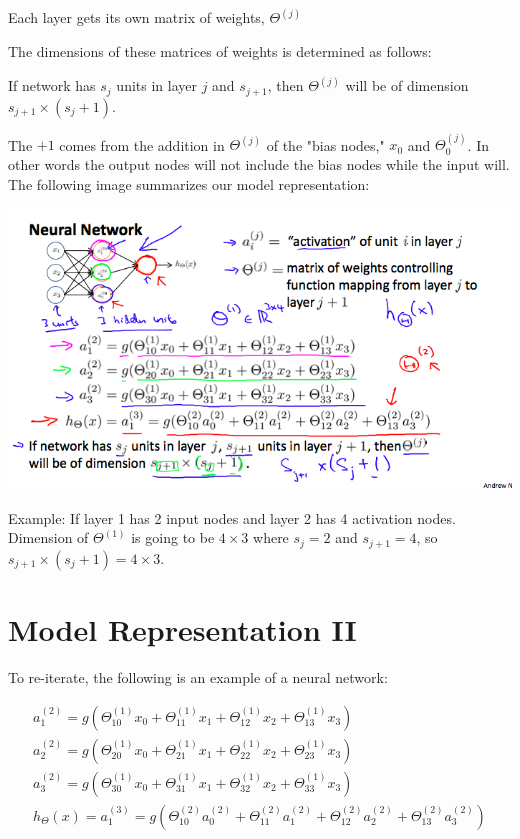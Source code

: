 \documentclass[10pt,a4paper,UTF8]{article}
\begin{document}
Each layer gets its own matrix of weights, \(\Theta^{(j)}\)

The dimensions of these matrices of weights is determined as follows:

If network has \(s_{j}\) units in layer \(j\) and \(s_{j+1}\), then \(\Theta^{(j)}\) will be of dimension \(s_{j+1}\times(s_{j} + 1)\).

The \(+1\) comes from the addition in \(\Theta^{(j)}\) of the "bias nodes," \(x_{0}\) and \(\Theta_{0}^{(j)}\). In other words the output nodes will not include the bias nodes while the input will. The following image summarizes our model representation:

\begin{center}
\includegraphics[width=.9\linewidth]{../../img/computer_ng/20171011modelRepresentation1.png}
\end{center}

Example: If layer 1 has 2 input nodes and layer 2 has 4 activation nodes. Dimension of \(\Theta^{(1)}\) is going to be \(4\times 3\) where \(s_{j} = 2\) and \(s_{j+1} = 4\), so \(s_{j+1}\times (s_{j} + 1) = 4\times 3\).

\section{Model Representation II}
\label{sec:org225425e}


To re-iterate, the following is an example of a neural network:

\begin{align*} a_1^{(2)} = g(\Theta_{10}^{(1)}x_0 + \Theta_{11}^{(1)}x_1 + \Theta_{12}^{(1)}x_2 + \Theta_{13}^{(1)}x_3) \\ a_2^{(2)} = g(\Theta_{20}^{(1)}x_0 + \Theta_{21}^{(1)}x_1 + \Theta_{22}^{(1)}x_2 + \Theta_{23}^{(1)}x_3) \\ a_3^{(2)} = g(\Theta_{30}^{(1)}x_0 + \Theta_{31}^{(1)}x_1 + \Theta_{32}^{(1)}x_2 + \Theta_{33}^{(1)}x_3) \\ h_\Theta(x) = a_1^{(3)} = g(\Theta_{10}^{(2)}a_0^{(2)} + \Theta_{11}^{(2)}a_1^{(2)} + \Theta_{12}^{(2)}a_2^{(2)} + \Theta_{13}^{(2)}a_3^{(2)}) \\ \end{align*}
\end{document}
